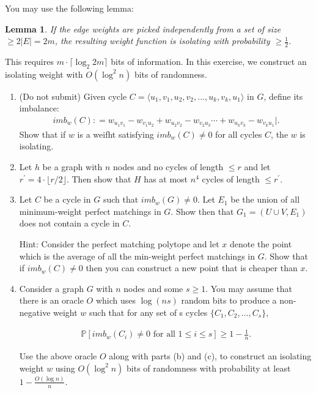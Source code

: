 \documentclass{article}
\theoremstyle{plain}
\newtheorem{lemma}{Lemma}
\renewcommand{\P}{\mathbb{P}}
\begin{document}
\begin{enumerate}
You may use the following lemma:
\begin{lemma}
  If the edge weights are picked independently
  from a set of size $\geq 2|E| = 2m$, the resulting weight function is isolating with probability $\geq \frac{1}{2}$.
\end{lemma}
This requires $m \cdot \lceil \log_2{2m}\rceil$ bits of information. In
  this exercise, we construct an isolating weight with $O(\log^2 n)$
  bits of randomness.
  \begin{enumerate}
  \item (Do not submit) Given cycle $C = \langle u_1, v_1, u_2, v_2, . . . , u_k, v_k, u_1 \rangle$  in $G$, define its imbalance:
    \begin{align*}
i m b _ { w } ( C ) : =  w _ { u _ { 1} v _ { 1} } - w _ { v _ { 1} u _ { 2} } + w _ { u _ { 2} v _ { 2} } - w _ { v _ { 2} u _ { 3} } \cdots + w _ { u _ { k } v _ { k } } - w _ { v _ { k } u _ { 1} } |.
    \end{align*}
    Show that if $w$ is a weifht satisfying $imb_w(C) \neq 0$ for all cycles $C$, the $w$ is isolating.
  \item Let $h$ be a graph with $n$ nodes and no cycles of length
    $\leq r$ and let $r^\prime = 4 \cdot
    \lfloor r/2 \rfloor$. Then
    show that $H$ has at most $n^4$ cycles of length $\leq r^\prime$.
  \item Let $C$ be a cycle in $G$ such that $imb_w(G) \neq 0$. Let
    $E_1$ be the union of all minimum-weight perfect matchings in
    $G$. Show then that $G_1 = (U \cup V, E_1)$ does not contain a
    cycle in $C$.

    Hint: Consider the perfect matching polytope and let $x$ denote
    the point which is the average of all the min-weight perfect
    matchings in $G$. Show that if $imb_w(C) \neq 0$ then you can
    construct a new point that is cheaper than $x$.
  \item Consider a graph $G$ with $n$ nodes and some $s\geq 1$. You may assume that there is an oracle $O$
which uses $\log(ns)$ random bits to produce a non-negative weight $w$ such that for any
set of s cycles $\{C_1, C_2,\ldots ,C_s\}$,

\begin{align*}
\P[imb_w ( C _ { i } ) \neq 0\text{ for all }1 \leq i \leq s ] \geq 1- \frac { 1} { n }.
\end{align*}

Use the above oracle $O$ along with parts (b) and (c), to construct an isolating weight $w$
using $O(\log^2 n)$ bits of randomness with probability at least $1 -\frac{O(\log n)}{n}$.

    \end{enumerate}
   
\end{enumerate}
\end{document}

